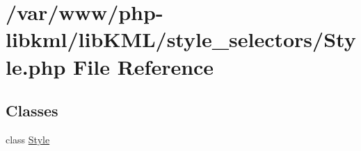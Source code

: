 \hypertarget{Style_8php}{
\section{/var/www/php-\/libkml/libKML/style\_\-selectors/Style.php File Reference}
\label{da/d4f/Style_8php}
}
\subsection*{Classes}
\begin{DoxyCompactItemize}
\item 
class \hyperlink{classStyle}{Style}
\end{DoxyCompactItemize}
